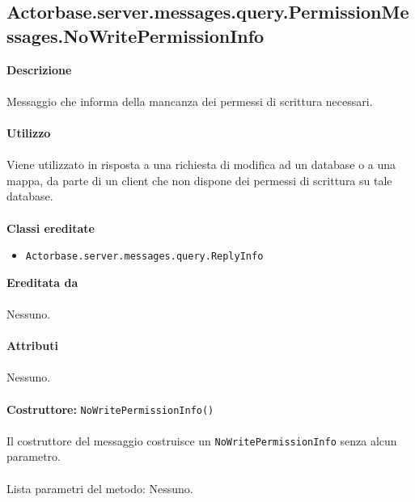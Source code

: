 \documentclass[a4paper]{article}
\begin{document}
\subsection{Actorbase.server.messages.query.PermissionMessages.NoWritePermissionInfo}
		\textbf{Descrizione}
			\\ \\
			Messaggio che informa della mancanza dei permessi di scrittura necessari.
			\\ \\
		\textbf{Utilizzo}
			\\ \\
			Viene utilizzato in risposta a una richiesta di modifica ad un database o a una mappa, da parte di un client che non dispone dei permessi di scrittura su tale database.
			\\ \\
		\textbf{Classi ereditate}
			\begin{itemize}
				\item \texttt{Actorbase.server.messages.query.ReplyInfo}
			\end{itemize}
		\textbf{Ereditata da}
			\\ \\
			Nessuno.
			\\ \\
		\textbf{Attributi}
			\\ \\
			Nessuno.
			\\ \\
		\textbf{Costruttore: } \texttt{NoWritePermissionInfo()}
			\\ \\
			Il costruttore del messaggio costruisce un \texttt{NoWritePermissionInfo} senza alcun parametro.
			\\ \\
			Lista parametri del metodo: Nessuno.
			
\end{document}
